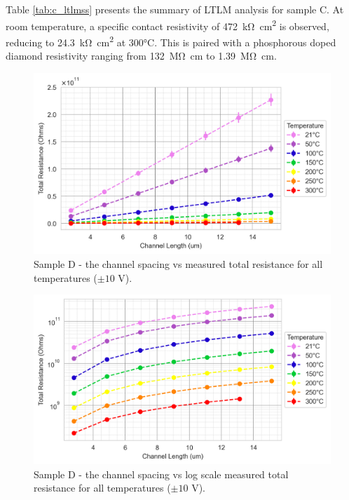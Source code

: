 \begin{refsection}
Table \ref{tab:c_ltlmss} presents the summary of LTLM analysis for sample C. At room temperature, a specific contact resistivity of 472~\si{\kilo\ohm\centi\metre\squared} is observed, reducing to 24.3~\si{\kilo\ohm\centi\metre\squared} at 300\si{\degreeCelsius}. This is paired with a phosphorous doped diamond resistivity ranging from 132~\si{\mega\ohm\centi\metre} to 1.39~\si{\mega\ohm\centi\metre}.

\begin{figure}[H]
    \centering
    \includegraphics[width=\textwidth]{Chapter3/Figs/Raster/Sample D 2019/TLM 10V/All Lin Reg TLM Plot Linear scale.png}
    \caption{Sample D - the channel spacing vs measured total resistance for all temperatures ($\pm10$ \si{\volt}).}
    \label{fig:D_tlm_lin}
\end{figure}

\begin{figure}[H]
    \centering
    \includegraphics[width=\textwidth]{Chapter3/Figs/Raster/Sample D 2019/TLM 10V/All Lin Reg TLM Plot Log scale.png}
    \caption{Sample D - the channel spacing vs log scale measured total resistance for all temperatures ($\pm10$ \si{\volt}).}
    \label{fig:d_tlm_log}
\end{figure}


\end{refsection}
